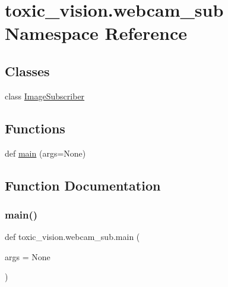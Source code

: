 \hypertarget{namespacetoxic__vision_1_1webcam__sub}{}\section{toxic\+\_\+vision.\+webcam\+\_\+sub Namespace Reference}
\label{namespacetoxic__vision_1_1webcam__sub}
\subsection*{Classes}
\begin{DoxyCompactItemize}
\item 
class \mbox{\hyperlink{classtoxic__vision_1_1webcam__sub_1_1ImageSubscriber}{Image\+Subscriber}}
\end{DoxyCompactItemize}
\subsection*{Functions}
\begin{DoxyCompactItemize}
\item 
def \mbox{\hyperlink{namespacetoxic__vision_1_1webcam__sub_ae5a86a4c83b069a7d8ab88d2836d2e6e}{main}} (args=None)
\end{DoxyCompactItemize}


\subsection{Function Documentation}
\mbox{\label{namespacetoxic__vision_1_1webcam__sub_ae5a86a4c83b069a7d8ab88d2836d2e6e}} 
\subsubsection{\texorpdfstring{main()}{main()}}
{\footnotesize\ttfamily def toxic\+\_\+vision.\+webcam\+\_\+sub.\+main (\begin{DoxyParamCaption}\item[{}]{args = {\ttfamily None} }\end{DoxyParamCaption})}

